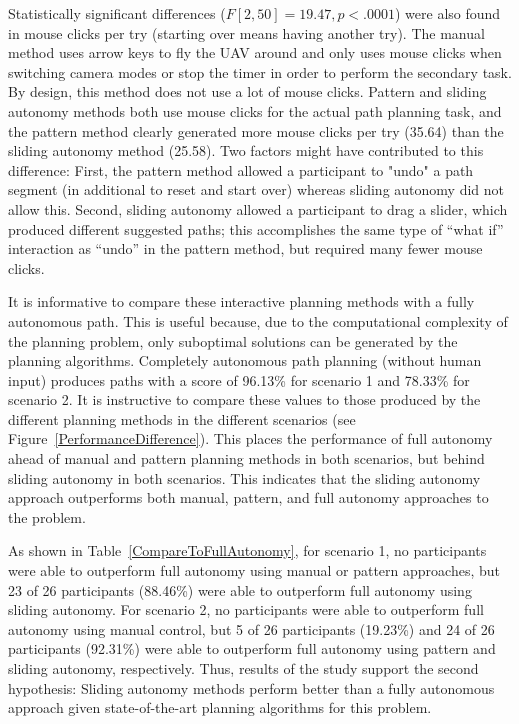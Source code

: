 Statistically significant differences ($F[2,50]=19.47, p<.0001$) were also found in mouse clicks per try (starting over means having another try). The manual method uses arrow keys to fly the UAV around and only uses mouse clicks when switching camera modes or stop the timer in order to perform the secondary task. By design, this method does not use a lot of mouse clicks. Pattern and sliding autonomy methods both use mouse clicks for the actual path planning task, and the pattern method clearly generated more mouse clicks per try (35.64) than the sliding autonomy method (25.58). Two factors might have contributed to this difference: First, the pattern method allowed a participant to "undo" a path segment (in additional to reset and start over) whereas sliding autonomy did not allow this. Second, sliding autonomy allowed a participant to drag a slider, which produced different suggested paths; this accomplishes the same type of ``what if'' interaction as ``undo'' in the pattern method, but required many fewer mouse clicks.

It is informative to compare these interactive planning methods with a fully autonomous path. This is useful because, due to the computational complexity of the planning problem, only suboptimal solutions can be generated by the planning algorithms. Completely autonomous path planning (without human input) produces paths with a score of 96.13\% for scenario 1 and 78.33\% for scenario 2. It is instructive to compare these values to those produced by the different planning methods in the different scenarios (see Figure~\ref{PerformanceDifference}). This places the performance of full autonomy ahead of manual and pattern planning methods in both scenarios, but behind sliding autonomy in both scenarios. This indicates that the sliding autonomy approach outperforms both manual, pattern, and full autonomy approaches to the problem.

As shown in Table~\ref{CompareToFullAutonomy}, for scenario 1, no participants were able to outperform full autonomy using manual or pattern approaches, but 23 of 26 participants (88.46\%) were able to outperform full autonomy using sliding autonomy. For scenario 2, no participants were able to outperform full autonomy using manual control, but 5 of 26 participants (19.23\%) and 24 of 26 participants (92.31\%) were able to outperform full autonomy using pattern and sliding autonomy, respectively. Thus, results of the study support the second hypothesis: Sliding autonomy methods perform better than a fully autonomous approach given state-of-the-art planning algorithms for this problem.


